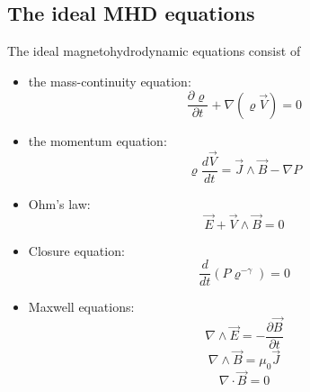 \subsection{The ideal MHD equations}
The ideal magnetohydrodynamic equations consist of
\begin{itemize}
    \item the mass-continuity equation:
            \begin{equation}
                \frac{\partial\varrho}{\partial t} + \nabla(\varrho \vec{V}) = 0
            \end{equation}
    \item the momentum equation:
            \begin{equation}
                \varrho \frac{d \vec{V}}{dt} = \vec{J} \wedge \vec{B} - \nabla P
            \end{equation}
    \item Ohm's law:
            \begin{equation}
                \vec{E} + \vec{V} \wedge \vec{B} = 0
            \end{equation}
    \item Closure equation:
            \begin{equation}
                \frac{d}{dt}\left(P \varrho^{-\gamma}\right) = 0
            \end{equation}
    \item Maxwell equations:
            \begin{equation}
                \nabla\wedge\vec{E} = - \frac{\partial \vec{B}}{\partial t}
            \end{equation}
            \begin{equation}
                \nabla\wedge\vec{B} =  \mu_0 \vec{J}
            \end{equation}
            \begin{equation}
                \nabla\cdot\vec{B} = 0
            \end{equation}
\end{itemize}